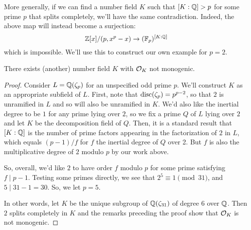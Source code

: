 More generally, if we can find a number field $K$ such that $[K:\mathbb{Q}] > p$ for some prime $p$ that splits completely, we'll have the same contradiction. Indeed, the above map will instead become a surjection:
\[ \mathbb{Z}[x]/(p,x^p-x) \to (\mathbb{F}_p)^{[K:\mathbb{Q}]} \]
which is impossible. We'll use this to construct our own example for $p=2$.

\begin{thm} There exists (another) number field $K$ with $\mathcal{O}_K$ not monogenic. \end{thm}
\begin{proof}
	Consider $L = \mathbb{Q}(\zeta_p)$ for an unspecified odd prime $p$. We'll construct $K$ as an appropriate subfield of $L$. First, note that $\operatorname{disc}(\zeta_p) = p^{p-2}$, so that $2$ is unramified in $L$ and so will also be unramified in $K$. We'd also like the inertial degree to be $1$ for any prime lying over $2$, so we fix a prime $Q$ of $L$ lying over $2$ and let $K$ be the decomposition field of $Q$. Then, it is a standard result that $[K:\mathbb{Q}]$ is the number of prime factors appearing in the factorization of $2$ in $L$, which equals $(p-1)/f$ for $f$ the inertial degree of $Q$ over 2. But $f$ is also the multiplicative degree of $2$ modulo $p$ by our work above.
	
	So, overall, we'd like $2$ to have order $f$ modulo $p$ for some prime satisfying $f \mid p-1$. Testing some primes directly, we see that $2^5 \equiv 1 \pmod{31}$, and $5 \mid 31-1 = 30$. So, we let $p=5$.
	
	In other words, let $K$ be the unique subgroup of $\mathbb{Q}(\zeta_{31})$ of degree $6$ over $\mathbb{Q}$. Then $2$ splits completely in $K$ and the remarks preceding the proof show that $\mathcal{O}_K$ is not monogenic.
\end{proof}











